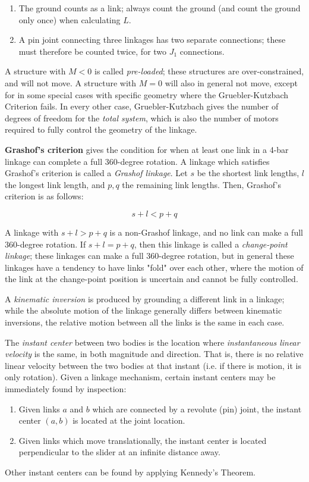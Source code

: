 \begin{enumerate}
    \item[-] The ground counts as a link; always count the ground (and count the ground only once) when calculating $L$.
    \item[-] A pin joint connecting three linkages has two separate connections; these must therefore be counted twice, for two $J_1$ connections.
\end{enumerate}

A structure with $M<0$ is called \textit{pre-loaded}; these structures are over-constrained, and will not move. A structure with $M=0$ will also in general not move, except for in some special cases with specific geometry where the Gruebler-Kutzbach Criterion fails. In every other case, Gruebler-Kutzbach gives the number of degrees of freedom for the \textit{total system}, which is also the number of motors required to fully control the geometry of the linkage.

\textbf{Grashof's criterion} gives the condition for when at least one link in a 4-bar linkage can complete a full 360-degree rotation. A linkage which satisfies Grashof's criterion is called a \textit{Grashof linkage}. Let $s$ be the shortest link lengths, $l$ the longest link length, and $p,q$ the remaining link lengths. Then, Grashof's criterion is as follows:

\[s+l<p+q\tag{Grashof's Criterion}\]

A linkage with $s+l>p+q$ is a non-Grashof linkage, and no link can make a full 360-degree rotation. If $s+l=p+q$, then this linkage is called a \textit{change-point linkage}; these linkages can make a full 360-degree rotation, but in general these linkages have a tendency to have links "fold" over each other, where the motion of the link at the change-point position is uncertain and cannot be fully controlled.

A \textit{kinematic inversion} is produced by grounding a different link in a linkage; while the absolute motion of the linkage generally differs between kinematic inversions, the relative motion between all the links is the same in each case.

The \textit{instant center} between two bodies is the location where \textit{instantaneous linear velocity} is the same, in both magnitude and direction. That is, there is no relative linear velocity between the two bodies at that instant (i.e. if there is motion, it is only rotation). Given a linkage mechanism, certain instant centers may be immediately found by inspection: \begin{enumerate}
    \item[] Given links $a$ and $b$ which are connected by a revolute (pin) joint, the instant center $(a,b)$ is located at the joint location.
    \item[] Given links which move translationally, the instant center is located perpendicular to the slider at an infinite distance away.
\end{enumerate}
Other instant centers can be found by applying Kennedy's Theorem.

